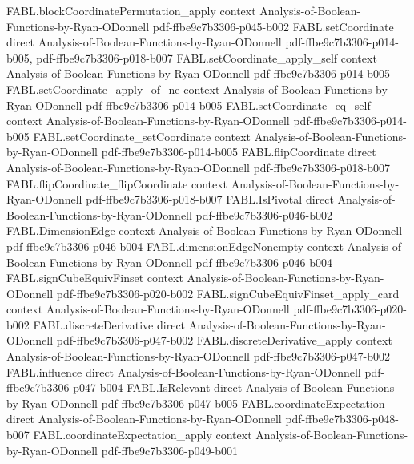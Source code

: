 \begin{theorem}
\proofstep
  {FABL.blockCoordinatePermutation_apply}
  {context}
  {Analysis-of-Boolean-Functions-by-Ryan-ODonnell}
  {pdf-ffbe9c7b3306-p045-b002}
\proofstep
  {FABL.setCoordinate}
  {direct}
  {Analysis-of-Boolean-Functions-by-Ryan-ODonnell}
  {pdf-ffbe9c7b3306-p014-b005,
    pdf-ffbe9c7b3306-p018-b007}
\proofstep
  {FABL.setCoordinate_apply_self}
  {context}
  {Analysis-of-Boolean-Functions-by-Ryan-ODonnell}
  {pdf-ffbe9c7b3306-p014-b005}
\proofstep
  {FABL.setCoordinate_apply_of_ne}
  {context}
  {Analysis-of-Boolean-Functions-by-Ryan-ODonnell}
  {pdf-ffbe9c7b3306-p014-b005}
\proofstep
  {FABL.setCoordinate_eq_self}
  {context}
  {Analysis-of-Boolean-Functions-by-Ryan-ODonnell}
  {pdf-ffbe9c7b3306-p014-b005}
\proofstep
  {FABL.setCoordinate_setCoordinate}
  {context}
  {Analysis-of-Boolean-Functions-by-Ryan-ODonnell}
  {pdf-ffbe9c7b3306-p014-b005}
\proofstep
  {FABL.flipCoordinate}
  {direct}
  {Analysis-of-Boolean-Functions-by-Ryan-ODonnell}
  {pdf-ffbe9c7b3306-p018-b007}
\proofstep
  {FABL.flipCoordinate_flipCoordinate}
  {context}
  {Analysis-of-Boolean-Functions-by-Ryan-ODonnell}
  {pdf-ffbe9c7b3306-p018-b007}
\proofstep
  {FABL.IsPivotal}
  {direct}
  {Analysis-of-Boolean-Functions-by-Ryan-ODonnell}
  {pdf-ffbe9c7b3306-p046-b002}
\proofstep
  {FABL.DimensionEdge}
  {context}
  {Analysis-of-Boolean-Functions-by-Ryan-ODonnell}
  {pdf-ffbe9c7b3306-p046-b004}
\proofstep
  {FABL.dimensionEdgeNonempty}
  {context}
  {Analysis-of-Boolean-Functions-by-Ryan-ODonnell}
  {pdf-ffbe9c7b3306-p046-b004}
\proofstep
  {FABL.signCubeEquivFinset}
  {context}
  {Analysis-of-Boolean-Functions-by-Ryan-ODonnell}
  {pdf-ffbe9c7b3306-p020-b002}
\proofstep
  {FABL.signCubeEquivFinset_apply_card}
  {context}
  {Analysis-of-Boolean-Functions-by-Ryan-ODonnell}
  {pdf-ffbe9c7b3306-p020-b002}
\proofstep
  {FABL.discreteDerivative}
  {direct}
  {Analysis-of-Boolean-Functions-by-Ryan-ODonnell}
  {pdf-ffbe9c7b3306-p047-b002}
\proofstep
  {FABL.discreteDerivative_apply}
  {context}
  {Analysis-of-Boolean-Functions-by-Ryan-ODonnell}
  {pdf-ffbe9c7b3306-p047-b002}
\proofstep
  {FABL.influence}
  {direct}
  {Analysis-of-Boolean-Functions-by-Ryan-ODonnell}
  {pdf-ffbe9c7b3306-p047-b004}
\proofstep
  {FABL.IsRelevant}
  {direct}
  {Analysis-of-Boolean-Functions-by-Ryan-ODonnell}
  {pdf-ffbe9c7b3306-p047-b005}
\proofstep
  {FABL.coordinateExpectation}
  {direct}
  {Analysis-of-Boolean-Functions-by-Ryan-ODonnell}
  {pdf-ffbe9c7b3306-p048-b007}
\proofstep
  {FABL.coordinateExpectation_apply}
  {context}
  {Analysis-of-Boolean-Functions-by-Ryan-ODonnell}
  {pdf-ffbe9c7b3306-p049-b001}
\proofstep

\end{theorem}
